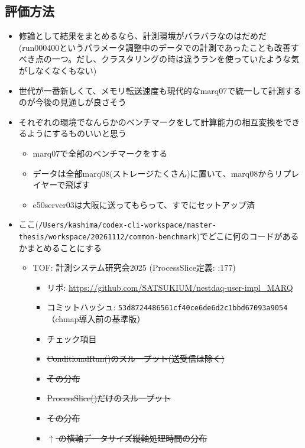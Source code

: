 \documentclass[../main.tex]{subfiles}
\begin{document}
\subsection{評価方法}
\begin{tcolorbox}
[
  title=執筆メモ,
  colback=yellow!8,
  colframe=black!30,
  breakable
]
\begin{itemize}
  \item 修論として結果をまとめるなら、計測環境がバラバラなのはだめだ(run000400というパラメータ調整中のデータでの計測であったことも改善すべき点の一つ。だし、クラスタリングの時は違うランを使っていたような気がしなくなくもない)
  \item 世代が一番新しくて、メモリ転送速度も現代的なmarq07で統一して計測するのが今後の見通しが良さそう
  \item それぞれの環境でなんらかのベンチマークをして計算能力の相互変換をできるようにするものいいと思う
  \begin{itemize}
    \item marq07で全部のベンチマークをする
    \item データは全部marq08(ストレージたくさん)に置いて、marq08からリプレイヤーで飛ばす
    \item e50server03は大阪に送ってもらって、すでにセットアップ済
  \end{itemize}
  \item ここ(\lstinline|/Users/kashima/codex-cli-workspace/master-thesis/workspace/20261112/common-benchmark|)でどこに何のコードがあるかまとめることにする
  \begin{itemize}
    \item TOF: 計測システム研究会2025 (ProcessSlice定義: :177)
    \begin{itemize}
      \item リポ: \url{https://github.com/SATSUKIUM/nestdaq-user-impl_MARQ}
      \item コミットハッシュ: \texttt{53d8724486561cf40ce6de6d2c1bbd67093a9054}（chmap導入前の基準版）
      \item チェック項目
      \item \sout{ConditionalRun()のスループット(送受信は除く)}
      \item \sout{その分布}
      \item \sout{ProcessSlice()だけのスループット}
      \item \sout{その分布}
      \item \sout{$\uparrow$ の横軸データサイズ縦軸処理時間の分布}

\end{itemize}
\end{itemize}
\end{itemize}
\end{tcolorbox}
\end{document}
